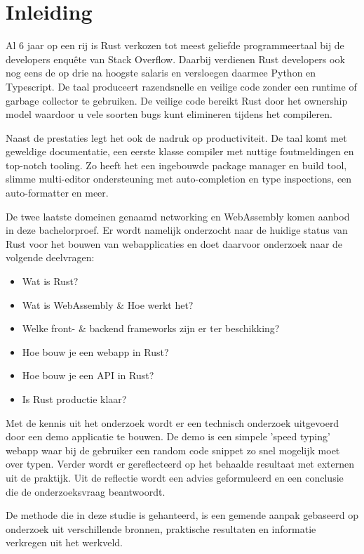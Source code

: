\chapter{Inleiding}

Al 6 jaar op een rij is Rust verkozen tot meest geliefde programmeertaal bij de developers enquête
van Stack Overflow. Daarbij verdienen Rust developers ook nog eens de op drie na hoogste salaris en
versloegen daarmee Python en Typescript. \cite{so_enquete} De taal produceert razendsnelle en
veilige code zonder een runtime of garbage collector te gebruiken. De veilige code bereikt Rust door
het ownership model waardoor u vele soorten bugs kunt elimineren tijdens het compileren.

Naast de prestaties legt het ook de nadruk op productiviteit. De taal komt met geweldige
documentatie, een eerste klasse compiler met nuttige foutmeldingen en top-notch tooling. Zo heeft
het een ingebouwde package manager en build tool, slimme multi-editor ondersteuning met
auto-completion en type inspections, een auto-formatter en meer. \cite{rustlang}

De twee laatste domeinen genaamd networking en WebAssembly komen aanbod in deze bachelorproef. 
Er wordt namelijk onderzocht naar de huidige status van Rust voor het bouwen van webapplicaties en
doet daarvoor onderzoek naar de volgende deelvragen:
\begin{itemize}
  \item Wat is Rust?
  \item Wat is WebAssembly \& Hoe werkt het?
  \item Welke front- \& backend frameworks zijn er ter beschikking?
  \item Hoe bouw je een webapp in Rust?
  \item Hoe bouw je een API in Rust?
  \item Is Rust productie klaar?
\end{itemize}

Met de kennis uit het onderzoek wordt er een technisch onderzoek uitgevoerd door een demo applicatie
te bouwen. De demo is een simpele 'speed typing' webapp waar bij de gebruiker een random code snippet
zo snel mogelijk moet over typen. Verder wordt er gereflecteerd op het behaalde resultaat met
externen uit de praktijk. Uit de reflectie wordt een advies geformuleerd en een conclusie die de
onderzoeksvraag beantwoordt.

De methode die in deze studie is gehanteerd, is een gemende aanpak gebaseerd op onderzoek uit
verschillende bronnen, praktische resultaten en informatie verkregen uit het werkveld.
